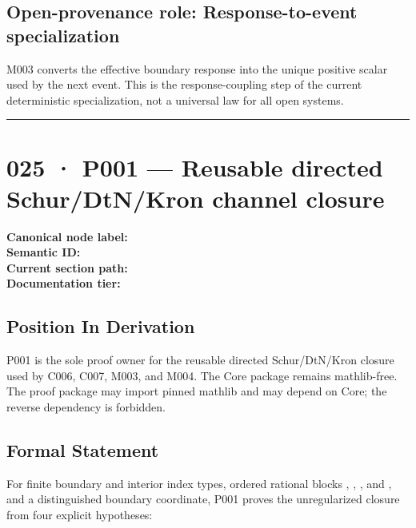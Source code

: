 \subsection{Open-provenance role: Response-to-event
specialization}\label{open-provenance-role-response-to-event-specialization}

M003 converts the effective boundary response into the unique positive
scalar used by the next event. This is the response-coupling step of the
current deterministic specialization, not a universal law for all open
systems.

\begin{center}\rule{0.5\linewidth}{0.5pt}\end{center}

\section{025 · P001 --- Reusable directed Schur/DtN/Kron channel
closure}\label{p001-reusable-directed-schurdtnkron-channel-closure}

\textbf{Canonical node label:} \texttt{\protect{}}\\
\textbf{Semantic ID:} \texttt{\protect{}}\\
\textbf{Current section path:} \texttt{\protect{}}\\
\textbf{Documentation tier:} \texttt{\protect{}}

\subsection{Position In Derivation}\label{position-in-derivation-21}

P001 is the sole proof owner for the reusable directed Schur/DtN/Kron
closure used by C006, C007, M003, and M004. The Core package remains
mathlib-free. The proof package may import pinned mathlib and may depend
on Core; the reverse dependency is forbidden.

\subsection{Formal Statement}\label{formal-statement-9}

For finite boundary and interior index types, ordered rational blocks
\texttt{\protect{}}, \texttt{\protect{}}, \texttt{\protect{}}, and \texttt{\protect{}}, and a
distinguished boundary coordinate, P001 proves the unregularized closure
from four explicit hypotheses:

